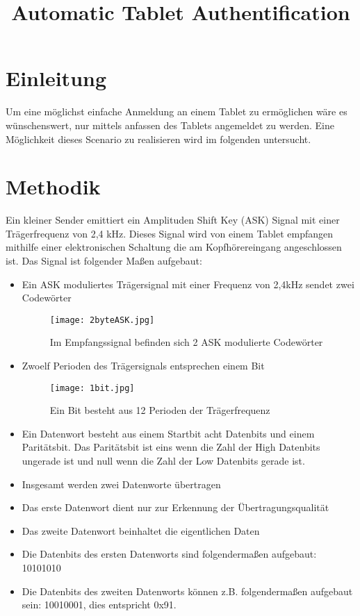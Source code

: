 \documentclass[10pt]{article}
\begin{document}
\title{Automatic Tablet Authentification}
\part{Einleitung}
Um eine möglichst einfache Anmeldung an einem Tablet zu ermöglichen wäre es wünschenswert, nur mittels anfassen des Tablets angemeldet zu werden. Eine Möglichkeit dieses Scenario zu realisieren wird im folgenden untersucht.
\part{Methodik}
Ein kleiner Sender emittiert ein Amplituden Shift Key (ASK) Signal mit einer Trägerfrequenz von 2,4 kHz. Dieses Signal wird von einem Tablet empfangen mithilfe einer elektronischen Schaltung die am Kopfhörereingang angeschlossen ist. Das Signal ist folgender Maßen aufgebaut:
\begin{itemize}
\item Ein ASK moduliertes Trägersignal mit einer Frequenz von 2,4kHz sendet zwei Codewörter
\begin{figure}[h!]
	\centering
	\texttt{[image: 2byteASK.jpg]}
	\caption{Im Empfangssignal befinden sich 2 ASK modulierte Codewörter}
	\label{img:1bit}
\end{figure}
\item Zwoelf Perioden des Trägersignals entsprechen einem Bit
\begin{figure}[h!]
	\centering
	\texttt{[image: 1bit.jpg]}
	\caption{Ein Bit besteht aus 12 Perioden der Trägerfrequenz}
	\label{img:1bit}
\end{figure}

\item Ein Datenwort besteht aus einem Startbit acht Datenbits und einem Paritätsbit. Das Paritätsbit ist eins wenn die Zahl der High Datenbits ungerade ist und null wenn die Zahl der Low Datenbits gerade ist.
\item Insgesamt werden zwei Datenworte übertragen
\item Das erste Datenwort dient nur zur Erkennung der Übertragungsqualität
\item Das zweite Datenwort beinhaltet die eigentlichen Daten
\item Die Datenbits des ersten Datenworts sind folgendermaßen aufgebaut: 10101010
\item Die Datenbits des zweiten Datenworts können z.B. folgendermaßen aufgebaut sein: 10010001, dies entspricht 0x91.
\end{itemize}
\end{document}
